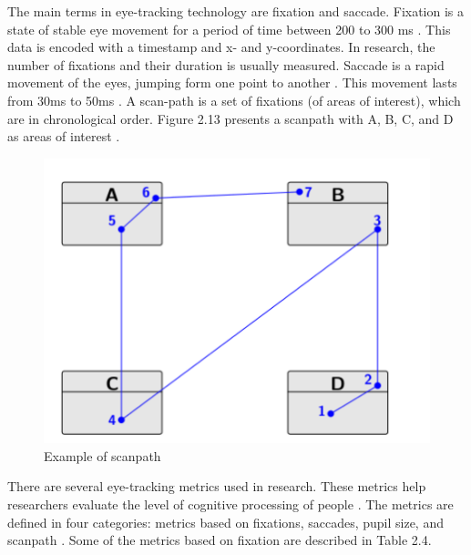 The main terms in eye-tracking technology are fixation and saccade. 
Fixation is a state of stable eye movement for a period of time between 200 to 300 ms \cite{sharafi2015systematic}. This data is encoded with a timestamp and x- and y-coordinates. 
In research, the number of fixations and their duration is usually measured. Saccade is a rapid movement of the eyes, jumping form one point to another \cite{andrzejewska2020development}.
This movement lasts from 30ms to 50ms \cite{obaidellah2018survey}. A scan-path is a set of fixations (of areas of interest), which are in chronological order. Figure 2.13  presents a scanpath with A, B, C, and D as areas of interest  \cite{sharafi2015systematic}.

\begin{figure} [H]
  \centering
  \includegraphics[scale=1.1]{figures/scanp.png}
  \caption{Example of scanpath \cite[p. 4]{sharafi2015systematic}}
  \label{fig:AnhangsChor}
\end{figure}


 
There are several eye-tracking metrics used in research. These metrics help researchers evaluate the level of cognitive processing of people \cite{obaidellah2018survey}. The metrics are defined in four categories: metrics based on fixations,
saccades, pupil size, and scanpath \cite{sharafi2015eye}. Some of the metrics based on fixation are described in Table 2.4.

